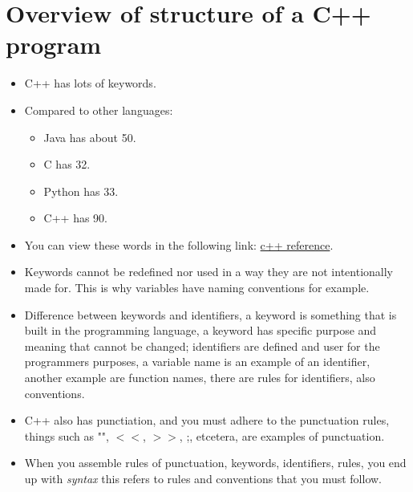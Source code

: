 \section{Overview of structure of a C++ program}
\begin{itemize}
    \item C++ has lots of keywords.
    \item Compared to other languages:
        \begin{itemize}
            \item Java has about 50.
            \item C has 32.
            \item Python has 33.
            \item C++ has 90.
        \end{itemize}
    
    \item You can view these words in the following link: \hyperlink{https://en.cppreference.com/w/cpp/keyword}{c++ reference}.
    \item Keywords cannot be redefined nor used in a way they are not intentionally made for. This is why variables have naming conventions for example.
    \item Difference between keywords and identifiers, a keyword is something that is built in the programming language, a keyword has specific purpose and meaning that cannot be changed; identifiers are defined and user for the programmers purposes, a variable name is an example of an identifier, another example are function names, there are rules for identifiers, also conventions.
    \item C++ also has punctiation, and you must adhere to the punctuation rules, things such as "", $<<$, $>>$, ;, etcetera, are examples of punctuation.
    \item When you assemble rules of punctuation, keywords, identifiers, rules, you end up with \emph{syntax} this refers to rules and conventions that you must follow.
\end{itemize}

